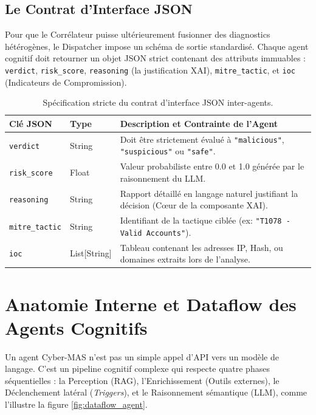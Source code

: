 \documentclass[a4paper, 12pt]{report}
\begin{document}
\subsection{Le Contrat d'Interface JSON}
Pour que le Corrélateur puisse ultérieurement fusionner des diagnostics hétérogènes, le Dispatcher impose un schéma de sortie standardisé. Chaque agent cognitif doit retourner un objet JSON strict contenant des attributs immuables : \texttt{verdict}, \texttt{risk\_score}, \texttt{reasoning} (la justification XAI), \texttt{mitre\_tactic}, et \texttt{ioc} (Indicateurs de Compromission).

\begin{table}[htbp]
\centering
\caption[Spécification stricte du contrat d'interface JSON inter-agents]{Spécification stricte du contrat d'interface JSON inter-agents.}
\label{tab:json_contract}
\vspace{0.2cm}
\begin{tabular}{|l|l|>{\raggedright\arraybackslash}p{7.5cm}|}
\hline
\textbf{Clé JSON} & \textbf{Type} & \textbf{Description et Contrainte de l'Agent} \\ \hline
\texttt{verdict} & String & Doit être strictement évalué à \texttt{"malicious"}, \texttt{"suspicious"} ou \texttt{"safe"}. \\ \hline
\texttt{risk\_score} & Float & Valeur probabiliste entre 0.0 et 1.0 générée par le raisonnement du LLM. \\ \hline
\texttt{reasoning} & String & Rapport détaillé en langage naturel justifiant la décision (Cœur de la composante XAI). \\ \hline
\texttt{mitre\_tactic} & String & Identifiant de la tactique ciblée (ex: \texttt{"T1078 - Valid Accounts"}). \\ \hline
\texttt{ioc} & List[String] & Tableau contenant les adresses IP, Hash, ou domaines extraits lors de l'analyse. \\ \hline
\end{tabular}
\end{table}

\section{Anatomie Interne et Dataflow des Agents Cognitifs}
\label{sec:anatomie_agents}

Un agent Cyber-MAS n'est pas un simple appel d'API vers un modèle de langage. C'est un pipeline cognitif complexe qui respecte quatre phases séquentielles : la Perception (RAG), l'Enrichissement (Outils externes), le Déclenchement latéral (\textit{Triggers}), et le Raisonnement sémantique (LLM), comme l'illustre la figure \ref{fig:dataflow_agent}.
\end{document}
